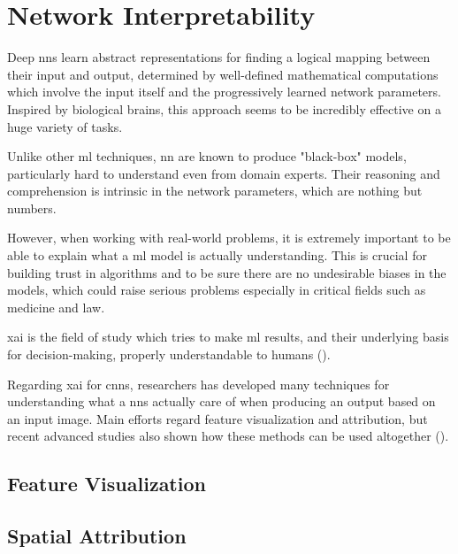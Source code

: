 \section{Network Interpretability}
\label{sec:network-interpretability}


Deep \gls{nn}s learn abstract representations for finding a logical mapping between their input and output, determined by well-defined mathematical computations which involve the input itself and the progressively learned network parameters. Inspired by biological brains, this approach seems to be incredibly effective on a huge variety of tasks.

Unlike other \gls{ml} techniques, \gls{nn} are known to produce "black-box" models, particularly hard to understand even from domain experts. Their reasoning and comprehension is intrinsic in the network parameters, which are nothing but numbers.

\medskip 

However, when working with real-world problems, it is extremely important to be able to explain what a \gls{ml} model is actually understanding. This is crucial for building trust in algorithms and to be sure there are no undesirable biases in the models, which could raise serious problems especially in critical fields such as medicine and law.

\gls{xai} is the field of study which tries to make \gls{ml} results, and their underlying basis for decision-making, properly understandable to humans (\cite{xai-wiki}). 

\medskip 

Regarding \gls{xai} for \gls{cnn}s, researchers has developed many techniques for understanding what a \gls{nn}s actually care of when producing an output based on an input image. Main efforts regard feature visualization and attribution, but recent advanced studies also shown how these methods can be used altogether (\cite{olah2018the}).



\subsection{Feature Visualization}





\subsection{Spatial Attribution}


